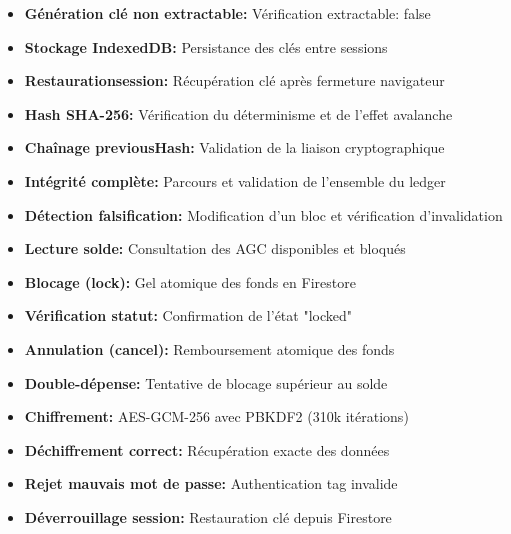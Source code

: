 \documentclass[12pt,a4paper]{report}
\begin{document}
\begin{tcolorbox}[infobox,title={Tests du stockage IndexedDB (Couche C2)}]
  \begin{itemize}[itemsep=3pt]
    \item \textbf{Génération clé non extractable:} Vérification extractable: false
    \item \textbf{Stockage IndexedDB:} Persistance des clés entre sessions
    \item \textbf{Restaurationsession:} Récupération clé après fermeture navigateur
  \end{itemize}
\end{tcolorbox}

\begin{tcolorbox}[infobox,title={Tests du Ledger immuable (Couche C6)}]
  \begin{itemize}[itemsep=3pt]
    \item \textbf{Hash SHA-256:} Vérification du déterminisme et de l'effet avalanche
    \item \textbf{Chaînage previousHash:} Validation de la liaison cryptographique
    \item \textbf{Intégrité complète:} Parcours et validation de l'ensemble du ledger
    \item \textbf{Détection falsification:} Modification d'un bloc et vérification d'invalidation
  \end{itemize}
\end{tcolorbox}

\begin{tcolorbox}[infobox,title={Tests du séquestre AGC (Couche C8)}]
  \begin{itemize}[itemsep=3pt]
    \item \textbf{Lecture solde:} Consultation des AGC disponibles et bloqués
    \item \textbf{Blocage (lock):} Gel atomique des fonds en Firestore
    \item \textbf{Vérification statut:} Confirmation de l'état "locked"
    \item \textbf{Annulation (cancel):} Remboursement atomique des fonds
    \item \textbf{Double-dépense:} Tentative de blocage supérieur au solde
  \end{itemize}
\end{tcolorbox}

\begin{tcolorbox}[infobox,title={Tests du chiffrement AES-GCM (Couche C7)}]
  \begin{itemize}[itemsep=3pt]
    \item \textbf{Chiffrement:} AES-GCM-256 avec PBKDF2 (310k itérations)
    \item \textbf{Déchiffrement correct:} Récupération exacte des données
    \item \textbf{Rejet mauvais mot de passe:} Authentication tag invalide
    \item \textbf{Déverrouillage session:} Restauration clé depuis Firestore
  \end{itemize}
\end{tcolorbox}
\end{document}
